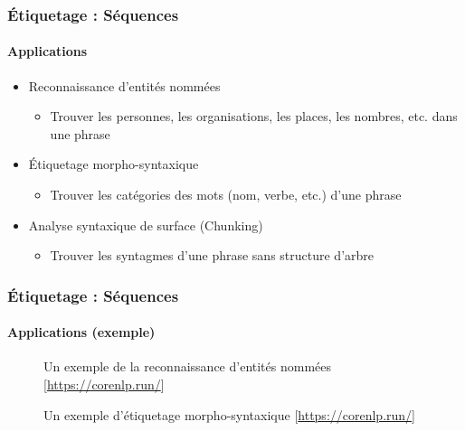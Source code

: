 \documentclass[xcolor=table]{beamer}
\begin{document}
\begin{frame}
\frametitle{Étiquetage : Séquences}
\framesubtitle{Applications}

\begin{itemize}
	\item Reconnaissance d'entités nommées
	\begin{itemize}
		\item Trouver les personnes, les organisations, les places, les nombres, etc. dans une phrase
	\end{itemize}
	\item Étiquetage morpho-syntaxique
	\begin{itemize}
		\item Trouver les catégories des mots (nom, verbe, etc.) d'une phrase
	\end{itemize}
	\item Analyse syntaxique de surface (Chunking)
	\begin{itemize}
		\item Trouver les syntagmes d'une phrase sans structure d'arbre
	\end{itemize}
\end{itemize}


\end{frame}

\begin{frame}
\frametitle{Étiquetage : Séquences}
\framesubtitle{Applications (exemple)}

\begin{figure}
	\centering
	\caption{Un exemple de la reconnaissance d'entités nommées [\url{https://corenlp.run/}]}
\end{figure}

\begin{figure}
	\centering
	\caption{Un exemple d'étiquetage morpho-syntaxique [\url{https://corenlp.run/}]}
\end{figure}

\end{frame}

%
%
%
\end{document}
